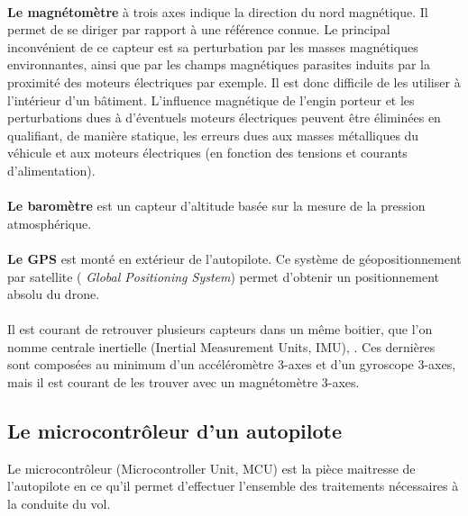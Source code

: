  \paragraph*{}
 \textbf{Le magnétomètre} à trois axes indique la direction du nord magnétique. Il permet de se diriger par rapport à une référence connue. Le principal inconvénient de ce capteur est sa perturbation par les masses magnétiques environnantes, ainsi que par les champs magnétiques parasites induits par la proximité des moteurs électriques par exemple. Il est donc difficile de les utiliser à l'intérieur d'un bâtiment. L'influence magnétique de l'engin porteur et les perturbations dues à d'éventuels moteurs électriques peuvent être éliminées en qualifiant, de manière statique, les erreurs dues aux masses métalliques du véhicule et aux moteurs électriques (en fonction des tensions et courants d'alimentation).

 \paragraph*{}
 \textbf{Le baromètre} est un capteur d'altitude basée sur la mesure de la pression atmosphérique.


 \paragraph*{}
 \textbf{Le GPS} est monté en extérieur de l'autopilote. Ce système de géopositionnement par satellite (\textit{ Global Positioning System})  permet d'obtenir un positionnement absolu du drone. 


 \paragraph*{}
 Il est courant de retrouver plusieurs capteurs dans un même boitier, que l'on nomme centrale inertielle (Inertial Measurement Units, IMU), . Ces dernières sont composées au minimum d'un accéléromètre 3-axes et d'un gyroscope 3-axes, mais il est courant de les trouver avec un magnétomètre 3-axes. 

 \subsection{Le microcontrôleur d'un autopilote}
 \label{sec:micoctrl}
 Le microcontrôleur (Microcontroller Unit, MCU)  est la pièce maitresse de l'autopilote en ce qu'il permet d'effectuer l'ensemble des traitements nécessaires à la conduite du vol.


